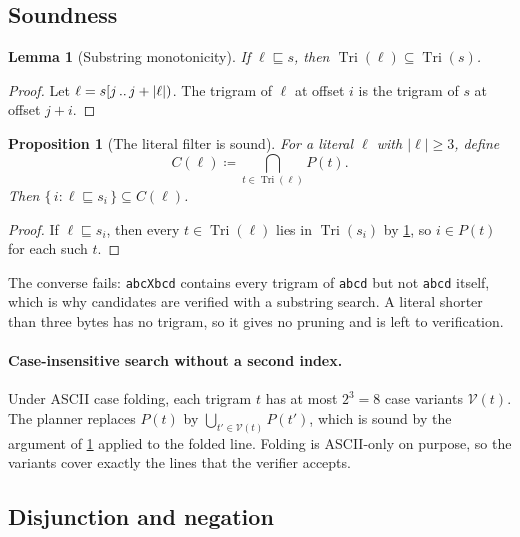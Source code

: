 \documentclass[11pt]{article}
\theoremstyle{plain}
\newtheorem{lemma}[theorem]{Lemma}
\newtheorem{proposition}[theorem]{Proposition}
\theoremstyle{definition}
\theoremstyle{remark}
\newcommand{\Tri}{\operatorname{Tri}}
\newcommand{\code}[1]{\texttt{#1}}
\newcommand{\sub}{\sqsubseteq}
\newcommand{\abs}[1]{\left\lvert #1 \right\rvert}
\begin{document}
\subsection{Soundness}

\begin{lemma}[Substring monotonicity]\label{lem:mono}
If $\ell \sub s$, then $\Tri(\ell) \subseteq \Tri(s)$.
\end{lemma}

\begin{proof}
Let $\ell = s[j \mathinner{..} j + \abs{\ell})$. The trigram of $\ell$ at offset
$i$ is the trigram of $s$ at offset $j + i$.
\end{proof}

\begin{proposition}[The literal filter is sound]\label{prop:literal}
For a literal $\ell$ with $\abs{\ell} \ge 3$, define
\begin{equation}\label{eq:literal}
  C(\ell) \coloneqq \bigcap_{t \in \Tri(\ell)} P(t).
\end{equation}
Then $\{\, i : \ell \sub s_i \,\} \subseteq C(\ell)$.
\end{proposition}

\begin{proof}
If $\ell \sub s_i$, then every $t \in \Tri(\ell)$ lies in $\Tri(s_i)$ by
\cref{lem:mono}, so $i \in P(t)$ for each such $t$.
\end{proof}

The converse fails: \code{abcXbcd} contains every trigram of \code{abcd} but not
\code{abcd} itself, which is why candidates are verified with a substring search.
A literal shorter than three bytes has no trigram, so it gives no pruning and is
left to verification.

\paragraph{Case-insensitive search without a second index.} Under ASCII case
folding, each trigram $t$ has at most $2^3 = 8$ case variants $\mathcal{V}(t)$.
The planner replaces $P(t)$ by $\bigcup_{t' \in \mathcal{V}(t)} P(t')$, which is
sound by the argument of \cref{prop:literal} applied to the folded line. Folding
is ASCII-only on purpose, so the variants cover exactly the lines that the
verifier accepts.

\subsection{Disjunction and negation}
\end{document}
